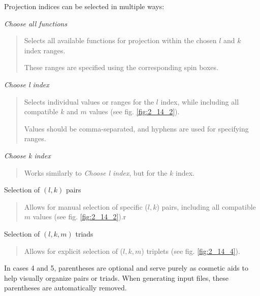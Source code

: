 \documentclass[10pt]{article}
\begin{document}
Projection indices can be selected in multiple ways:

\begin{enumerate}
\item {\it Choose all functions}
\vspace*{-5mm}
\begin{quote}
\item Selects all available functions for projection within the chosen $l$ and $k$ index ranges.
\item These ranges are specified using the corresponding spin boxes.
\end{quote}

\item {\it Choose l index}
\vspace*{-5mm}
\begin{quote}
\item Selects individual values or ranges for the $l$ index,
while including all compatible $k$ and $m$ values (see fig. \ref{fig:2_14_2}).
\item Values should be comma-separated, and hyphens are used for specifying ranges.
\end{quote}

\item {\it Choose k index}
\vspace*{-5mm}
\begin{quote}
\item Works similarly to {\it Choose l index}, but for the $k$ index.
\end{quote}

\item Selection of $(l,k)$ pairs
\vspace*{-5mm}
\begin{quote}
\item Allows for manual selection of specific ($l,k$) pairs,
including all compatible $m$ values (see fig. \ref{fig:2_14_2}).r
\end{quote}

\item Selection of $(l,k,m)$ triads
\vspace*{-5mm}
\begin{quote}
\item Allows for explicit selection of ($l,k,m$) triplets
(see fig. \ref{fig:2_14_4}).
\end{quote}
\end{enumerate}

In cases 4 and 5, parentheses are optional
and serve purely as cosmetic aids to help visually organize pairs or triads.
When generating input files, these parentheses are automatically removed.
\end{document}
